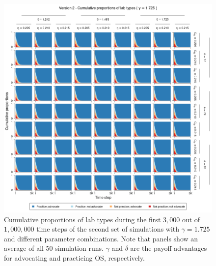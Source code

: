 \documentclass[meta, authordate,issue]{jote-new-article}
\begin{document}
\begin{figure}
  \begin{fullwidth}
    \centering
    \includegraphics[width=\textwidth]{v2_pro_plot_sens_payypro1.725.png}
    \caption{Cumulative proportions of lab types during the first $3,000$ out of $1,000,000$ time steps of the second set of simulations with $\gamma=1.725$ and different parameter combinations. Note that panels show an average of all $50$ simulation runs. $\gamma$ and $\delta$ are the payoff advantages for advocating and practicing OS, respectively.}
    \label{fig:v2_pro_plot_sens_payypro1.725}
  \end{fullwidth}
\end{figure}
%
%
\end{document}
